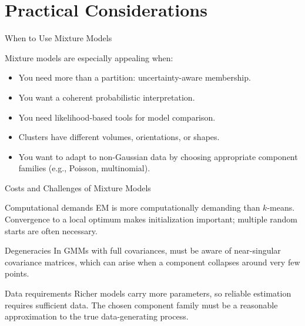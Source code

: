 \section{Practical Considerations}

\begin{frame}{When to Use Mixture Models}
  \begin{block}{Mixture models are especially appealing when:}
    \begin{itemize}
      \item You need more than a partition: \alert{uncertainty-aware membership}.
      \item You want a coherent \alert{probabilistic interpretation}.
      \item You need \alert{likelihood-based tools} for model comparison.
      \item Clusters have different volumes, orientations, or shapes.
      \item You want to adapt to \alert{non-Gaussian data} by choosing appropriate
            component families (e.g., Poisson, multinomial).
    \end{itemize}
  \end{block}
\end{frame}

\begin{frame}{Costs and Challenges of Mixture Models}
  \begin{alertblock}{Computational demands}
    EM is more computationally demanding than $k$-means. Convergence to a local optimum
    makes initialization important; multiple random starts are often necessary.
  \end{alertblock}
  \vspace{0.4em}
  \begin{alertblock}{Degeneracies}
    In GMMs with full covariances, must be aware of near-singular covariance matrices,
    which can arise when a component collapses around very few points.
  \end{alertblock}
  \vspace{0.4em}
  \begin{alertblock}{Data requirements}
    Richer models carry more parameters, so reliable estimation requires \alert{sufficient
    data}. The chosen component family must be a reasonable approximation to the true
    data-generating process.
  \end{alertblock}
\end{frame}

